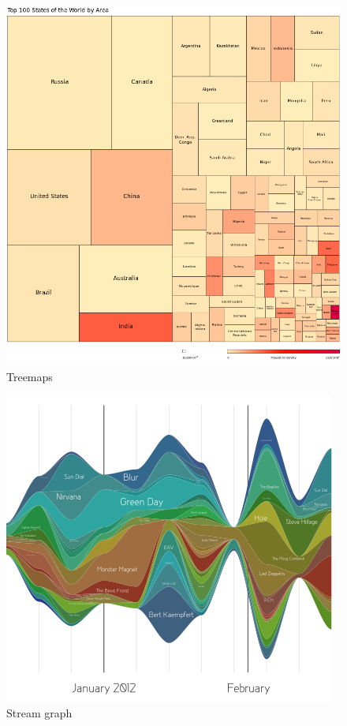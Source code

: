 \begin{figure}[ht]
      \includegraphics[width=\columnwidth]{images/Treemap.png}
      \caption{Treemaps \cite{Viz}}
      \label{tree}
\end{figure}
    
\begin{figure}[ht]  
      \includegraphics[width=\columnwidth]{images/Streamgraph.png}
      \caption{Stream graph \cite{Viz}}
      \label{stream}
\end{figure}

